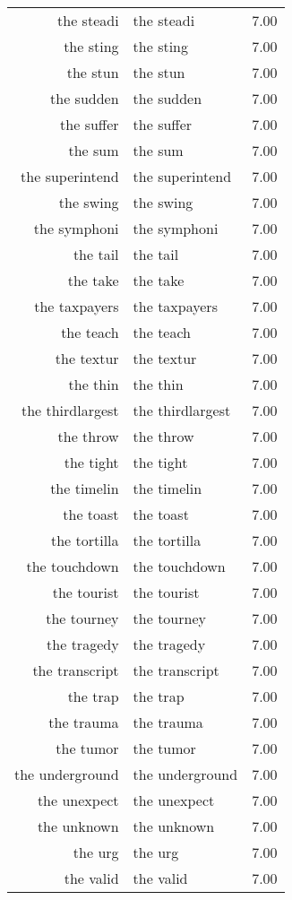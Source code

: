 \begin{table}[ht]
\begin{tabular}{rlr}
  the steadi & the steadi & 7.00 \\ 
  the sting & the sting & 7.00 \\ 
  the stun & the stun & 7.00 \\ 
  the sudden & the sudden & 7.00 \\ 
  the suffer & the suffer & 7.00 \\ 
  the sum & the sum & 7.00 \\ 
  the superintend & the superintend & 7.00 \\ 
  the swing & the swing & 7.00 \\ 
  the symphoni & the symphoni & 7.00 \\ 
  the tail & the tail & 7.00 \\ 
  the take & the take & 7.00 \\ 
  the taxpayers & the taxpayers & 7.00 \\ 
  the teach & the teach & 7.00 \\ 
  the textur & the textur & 7.00 \\ 
  the thin & the thin & 7.00 \\ 
  the thirdlargest & the thirdlargest & 7.00 \\ 
  the throw & the throw & 7.00 \\ 
  the tight & the tight & 7.00 \\ 
  the timelin & the timelin & 7.00 \\ 
  the toast & the toast & 7.00 \\ 
  the tortilla & the tortilla & 7.00 \\ 
  the touchdown & the touchdown & 7.00 \\ 
  the tourist & the tourist & 7.00 \\ 
  the tourney & the tourney & 7.00 \\ 
  the tragedy & the tragedy & 7.00 \\ 
  the transcript & the transcript & 7.00 \\ 
  the trap & the trap & 7.00 \\ 
  the trauma & the trauma & 7.00 \\ 
  the tumor & the tumor & 7.00 \\ 
  the underground & the underground & 7.00 \\ 
  the unexpect & the unexpect & 7.00 \\ 
  the unknown & the unknown & 7.00 \\ 
  the urg & the urg & 7.00 \\ 
  the valid & the valid & 7.00 \\ 

\end{tabular}
\end{table}
